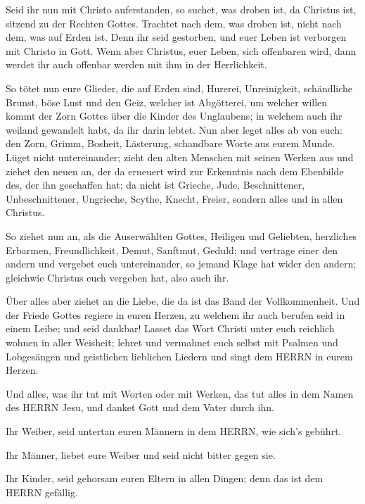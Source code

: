  Seid ihr nun mit Christo auferstanden, so suchet, was
droben ist, da Christus ist, sitzend zu der Rechten Gottes. 
Trachtet nach dem, was droben ist, nicht nach dem, was auf Erden ist.
 Denn ihr seid gestorben, und euer Leben ist verborgen mit
Christo in Gott.  Wenn aber Christus, euer Leben, sich
offenbaren wird, dann werdet ihr auch offenbar werden mit ihm in der
Herrlichkeit.

 So tötet nun eure Glieder, die auf Erden sind, Hurerei,
Unreinigkeit, schändliche Brunst, böse Lust und den Geiz, welcher ist
Abgötterei,  um welcher willen kommt der Zorn Gottes über
die Kinder des Unglaubens;  in welchem auch ihr weiland
gewandelt habt, da ihr darin lebtet.  Nun aber leget alles
ab von euch: den Zorn, Grimm, Bosheit, Lästerung, schandbare Worte aus
eurem Munde.  Lüget nicht untereinander; zieht den alten
Menschen mit seinen Werken aus  und ziehet den neuen an,
der da erneuert wird zur Erkenntnis nach dem Ebenbilde des, der ihn
geschaffen hat;  da nicht ist Grieche, Jude, Beschnittener,
Unbeschnittener, Ungrieche, Scythe, Knecht, Freier, sondern alles und in
allen Christus.

 So ziehet nun an, als die Auserwählten Gottes, Heiligen
und Geliebten, herzliches Erbarmen, Freundlichkeit, Demut, Sanftmut,
Geduld;  und vertrage einer den andern und vergebet euch
untereinander, so jemand Klage hat wider den andern; gleichwie Christus
euch vergeben hat, also auch ihr.

 Über alles aber ziehet an die Liebe, die da ist das Band
der Vollkommenheit.  Und der Friede Gottes regiere in euren
Herzen, zu welchem ihr auch berufen seid in einem Leibe; und seid
dankbar!  Lasset das Wort Christi unter euch reichlich
wohnen in aller Weisheit; lehret und vermahnet euch selbst mit Psalmen
und Lobgesängen und geistlichen lieblichen Liedern und singt dem HERRN
in eurem Herzen.

 Und alles, was ihr tut mit Worten oder mit Werken, das tut
alles in dem Namen des HERRN Jesu, und danket Gott und dem Vater durch
ihn.

 Ihr Weiber, seid untertan euren Männern in dem HERRN, wie
sich's gebührt.

 Ihr Männer, liebet eure Weiber und seid nicht bitter gegen
sie.

 Ihr Kinder, seid gehorsam euren Eltern in allen Dingen;
denn das ist dem HERRN gefällig.

